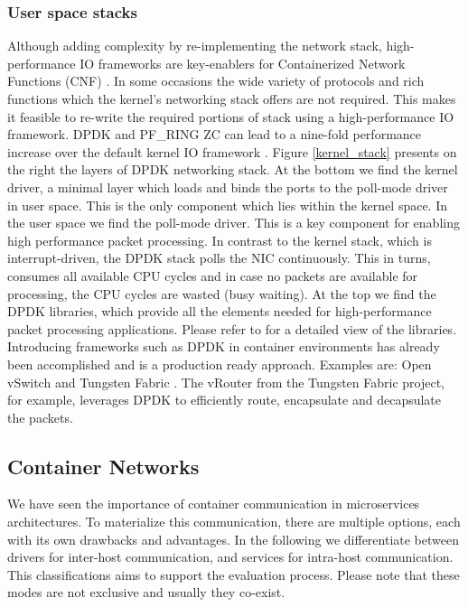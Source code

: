 \documentclass[conference]{IEEEtran}
\begin{document}
\subsubsection{User space stacks}
Although adding complexity by re-implementing the network stack, high-performance IO frameworks are key-enablers for Containerized Network Functions (CNF) \cite{SIGARCH_2017:Yang}. In some occasions the wide variety of protocols and rich functions which the kernel's networking stack offers are not required. This makes it feasible to re-write the required portions of stack using a high-performance IO framework. DPDK \cite{dpdk} and PF\_RING ZC \cite{pf_ring_zc} can lead to a nine-fold performance increase over the default kernel IO framework \cite{ANCS:Gallenmüller}. Figure \ref{kernel_stack} presents on the right the layers of DPDK networking stack. At the bottom we find the kernel driver, a minimal layer which loads and binds the ports to the poll-mode driver in user space. This is the only component which lies within the kernel space. In the user space we find the poll-mode driver. This is a key component for enabling high performance packet processing. In contrast to the kernel stack, which is interrupt-driven, the DPDK stack  polls the NIC continuously. This in turns, consumes all available CPU cycles and in case no packets are available for processing, the CPU cycles are wasted (busy waiting). At the top we find the DPDK libraries, which provide all the elements needed for high-performance packet processing applications. Please refer to \cite{dpdk} for a detailed view of the libraries.\\
Introducing frameworks such as DPDK in container environments has already been accomplished and is a production ready approach. Examples are: Open vSwitch \cite{ovs-dpdk} and Tungsten Fabric \cite{tungsten-dpdk}. The vRouter from the Tungsten Fabric project, for example, leverages DPDK to efficiently route, encapsulate and decapsulate the packets.

\subsection{Container Networks}
We have seen the importance of container communication in microservices architectures. To materialize this communication, there are multiple options, each with its own drawbacks and advantages. In the following we differentiate between drivers for inter-host communication, and services for intra-host communication. This classifications aims to support the evaluation process. Please note that these modes are not exclusive and usually they co-exist.
\end{document}
